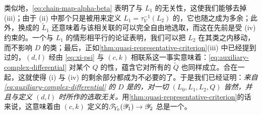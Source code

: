 类似地，\eqref{eq:chain-map-alpha-beta} 表明了与 $L_1$ 的无关性，这使我们能够去掉 (iii)；由于 (ii) 中那个\trTubularNeighborhood{}只是被用来定义 $L_1=\tau_V^{-1}(L_2)$ 的，它也随之成为多余；此外，换成\trIsotopy{}的 $\tilde{L}_1$ 还意味着与该\trSubmanifold{}相关联的\trFloerDatum{}可以完全自由地选取，而这在先前是受 (iv) 约束的。一个与 $L_1$ 的情形相平行的论证表明，我们可以把 $L_2$ 在其\trIsotopy{}类之内移动，而不影响 $D$ 的\trQuasiisomorphism{}类；最后，正如\cref{thm:quasi-representative-criterion}(iii) 中已经提到过的，$(d,l)$ 经由 \eqref{eq:xi-psi} 与 $(c,k)$ 相联系这一事实意味着：\eqref{eq:auxiliary-complex-differential} 对某个 $Q$ 的\trAcyclic{}性，蕴含它对所有\trIsotopy{}的 $\tilde{Q}$ 也同样成立。合在一起，这就使得 (i) 与 (iv) 的剩余部分都成为不必要的了。于是我们已经证明：\emph{来自 \eqref{eq:auxiliary-complex-differential} 的\trComplex{} $D$ 是\trAcyclic{}的，对一切 $(L_0,L_1,L_2,Q)$ 皆然，并且与定义 $(d,l)$ 时所作的选取无关。}用\cref{thm:quasi-representative-criterion}的话来说，这意味着由 $(c,k)$ 定义的\trMorphism{}$\mathscr{T}_{Y_0}(\mathscr{Y}_1)\to\mathscr{Y}_2$ 总是一个\trIsomorphism。
